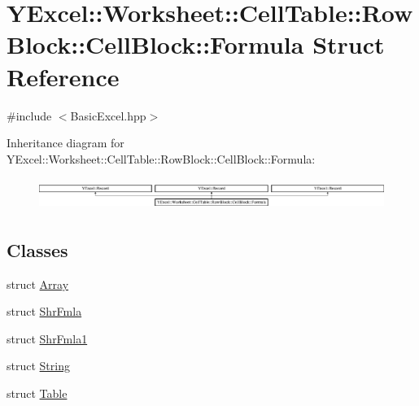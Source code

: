 \hypertarget{struct_y_excel_1_1_worksheet_1_1_cell_table_1_1_row_block_1_1_cell_block_1_1_formula}{}\section{Y\+Excel\+:\+:Worksheet\+:\+:Cell\+Table\+:\+:Row\+Block\+:\+:Cell\+Block\+:\+:Formula Struct Reference}
\label{struct_y_excel_1_1_worksheet_1_1_cell_table_1_1_row_block_1_1_cell_block_1_1_formula}


{\ttfamily \#include $<$Basic\+Excel.\+hpp$>$}

Inheritance diagram for Y\+Excel\+:\+:Worksheet\+:\+:Cell\+Table\+:\+:Row\+Block\+:\+:Cell\+Block\+:\+:Formula\+:\begin{figure}[H]
\begin{center}
\leavevmode
\includegraphics[height=1.048689cm]{struct_y_excel_1_1_worksheet_1_1_cell_table_1_1_row_block_1_1_cell_block_1_1_formula}
\end{center}
\end{figure}
\subsection*{Classes}
\begin{DoxyCompactItemize}
\item 
struct \hyperlink{struct_y_excel_1_1_worksheet_1_1_cell_table_1_1_row_block_1_1_cell_block_1_1_formula_1_1_array}{Array}
\item 
struct \hyperlink{struct_y_excel_1_1_worksheet_1_1_cell_table_1_1_row_block_1_1_cell_block_1_1_formula_1_1_shr_fmla}{Shr\+Fmla}
\item 
struct \hyperlink{struct_y_excel_1_1_worksheet_1_1_cell_table_1_1_row_block_1_1_cell_block_1_1_formula_1_1_shr_fmla1}{Shr\+Fmla1}
\item 
struct \hyperlink{struct_y_excel_1_1_worksheet_1_1_cell_table_1_1_row_block_1_1_cell_block_1_1_formula_1_1_string}{String}
\item 
struct \hyperlink{struct_y_excel_1_1_worksheet_1_1_cell_table_1_1_row_block_1_1_cell_block_1_1_formula_1_1_table}{Table}
\end{DoxyCompactItemize}
